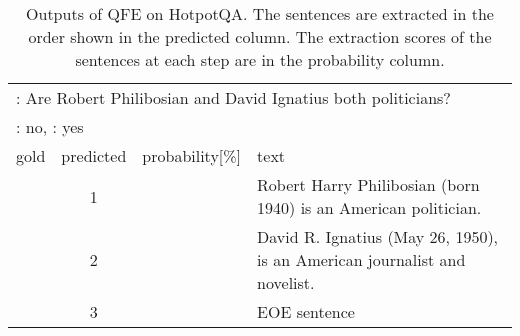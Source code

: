 \documentclass[11pt,a4paper]{article}
\theoremstyle{definition}
\begin{document}
\begin{table*}[t]
\begin{center}
{\begin{tabular}{ccll}
					\multicolumn{4}{l}{: Are Robert Philibosian and David Ignatius both politicians?} \\
					\multicolumn{4}{l}{: no, \quad : yes } \\ \hline
					gold & predicted & probability[\%] & text \\ \hline
					\checkmark & 1 &  & 
					\parbox{25em}{\strut{}Robert Harry Philibosian (born 1940) is an American politician.
			        \strut} \\ \checkmark & 2 &  & 
					\parbox{25em}{\strut{}David R. Ignatius (May 26, 1950), is an American journalist and novelist.
			        \strut} \\ & 3 &   & 
					\parbox{25em}{\strut{}EOE sentence \strut} \\ \hline \hline \end{tabular}}
		\end{center}

		\caption{Outputs of QFE on HotpotQA. The sentences are extracted in the order shown in the predicted column. The extraction scores of the sentences at each step are in the probability column.}\label{tab:appendix_hotpot}
	\end{table*}
\end{document}
